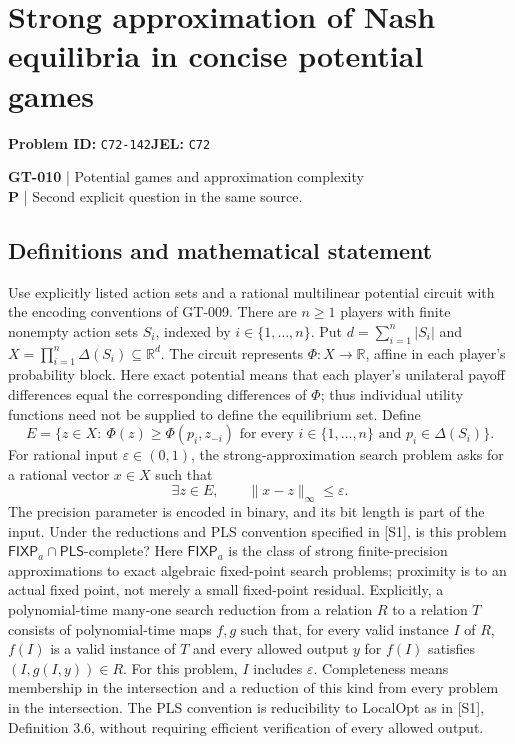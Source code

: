 \documentclass[11pt,a4paper]{article}
\newcommand{\R}{\mathbb R}
\begin{document}
\section*{Strong approximation of Nash equilibria in concise potential games}
\textbf{Problem ID:} \texttt{C72-142}\quad \textbf{JEL:} \texttt{C72}\par
\label{problem:OP-0140}
\label{game:GT-010}
{\sffamily\small\color{muted}
\textbf{GT-010} | Potential games and approximation complexity\\
\textbf{P} | Second explicit question in the same source.
\par}
\subsection*{Definitions and mathematical statement}
Use explicitly listed action sets and a rational multilinear potential circuit with the encoding conventions of GT-009. There are $n\geq1$ players with finite nonempty action sets $S_i$, indexed by $i\in\{1,\ldots,n\}$. Put $d=\sum_{i=1}^n|S_i|$ and $X=\prod_{i=1}^n\Delta(S_i)\subseteq\R^d$. The circuit represents $\Phi:X\to\R$, affine in each player's probability block. Here exact potential means that each player's unilateral payoff differences equal the corresponding differences of $\Phi$; thus individual utility functions need not be supplied to define the equilibrium set. Define
\[
 E=\{z\in X:\ \Phi(z)\geq\Phi(p_i,z_{-i})\text{ for every }i\in\{1,\ldots,n\}\text{ and }p_i\in\Delta(S_i)\}.
\]
For rational input $\varepsilon\in(0,1)$, the strong-approximation search problem asks for a rational vector $x\in X$ such that
\[
 \exists z\in E,\qquad \|x-z\|_\infty\leq\varepsilon.
\]
The precision parameter is encoded in binary, and its bit length is part of the input. Under the reductions and PLS convention specified in [S1], is this problem $\mathsf{FIXP}_a\cap\mathsf{PLS}$-complete? Here $\mathsf{FIXP}_a$ is the class of strong finite-precision approximations to exact algebraic fixed-point search problems; proximity is to an actual fixed point, not merely a small fixed-point residual.
Explicitly, a polynomial-time many-one search reduction from a relation $R$ to a relation $T$ consists of polynomial-time maps $f,g$ such that, for every valid instance $I$ of $R$, $f(I)$ is a valid instance of $T$ and every allowed output $y$ for $f(I)$ satisfies $(I,g(I,y))\in R$. For this problem, $I$ includes $\varepsilon$. Completeness means membership in the intersection and a reduction of this kind from every problem in the intersection. The PLS convention is reducibility to LocalOpt as in [S1], Definition 3.6, without requiring efficient verification of every allowed output.
\end{document}
